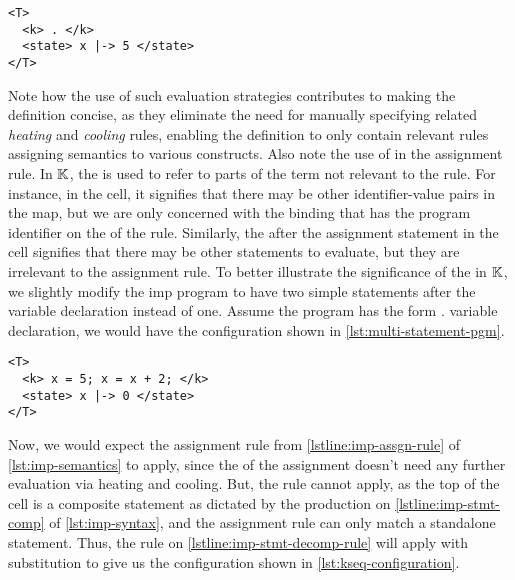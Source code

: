 \begin{lstlisting}[float=h!,language=k,style=ksty,frame=single,label=lst:final-configuration,caption={Final
Configuration}]
<T>
  <k> . </k>
  <state> x |-> 5 </state>
</T>
\end{lstlisting}

Note how the use of such evaluation strategies contributes to making the
definition concise, as they eliminate the need for manually specifying
related \emph{heating} and \emph{cooling} rules, enabling the definition
to only contain relevant rules assigning semantics to various constructs.
Also note the use of  in the assignment rule. In $\mathbb{K}{}$,
the  is used to refer to parts of the term
not relevant to the rule. For instance, in the 
cell, it signifies that there may be other identifier-value
pairs in the map, but we are only concerned with the binding that has the program identifier on the \LHS{} of
the rule. Similarly, the  after the assignment statement
in the  cell signifies that there may be other statements
to evaluate, but they are irrelevant to the assignment rule.
To better illustrate the significance of the  in $\mathbb{K}$,
we slightly modify the imp program to have two simple statements
after the variable declaration instead of one.
Assume the program has the form .
variable declaration, we would have the configuration shown in
\autoref{lst:multi-statement-pgm}.

\begin{lstlisting}[float=h!,language=k,style=ksty,frame=single,label=lst:multi-statement-pgm,caption={Multi-Statement
Imp Program}]
<T>
  <k> x = 5; x = x + 2; </k>
  <state> x |-> 0 </state>
</T>
\end{lstlisting}

Now, we would expect the assignment rule from \autoref{lstline:imp-assgn-rule}
of \autoref{lst:imp-semantics} to apply, since the \RHS{} of
the assignment  doesn't need any further
evaluation via heating and cooling.
But, the rule cannot apply, as the top of the  cell
is a composite statement as dictated by the production on
\autoref{lstline:imp-stmt-comp} of \autoref{lst:imp-syntax},
and the assignment rule can
only match a standalone statement. Thus, the rule on
\autoref{lstline:imp-stmt-decomp-rule} will apply with
substitution
to give us the configuration shown in
\autoref{lst:kseq-configuration}.


